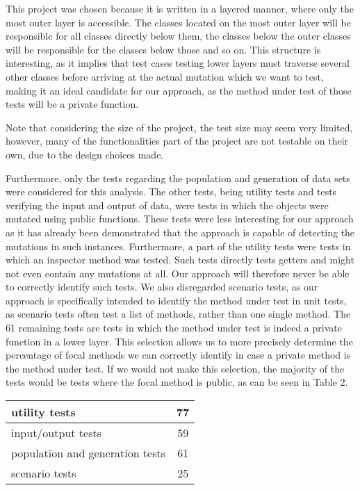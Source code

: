 \documentclass[11pt]{article}
\begin{document}
\begin{multicols}{2}
This project was chosen because it is written in a layered manner, where only the most outer layer is accessible. The classes located on the most outer layer will be responsible for all classes directly below them, the classes below the outer classes will be responsible for the classes below those and so on. This structure is interesting, as it implies that test cases testing lower layers must traverse several other classes before arriving at the actual mutation which we want to test, making it an ideal candidate for our approach, as the method under test of those tests will be a private function.

Note that considering the size of the project, the test size may seem very limited, however, many of the functionalities part of the project are not testable on their own, due to the design choices made. 

Furthermore, only the tests regarding the population and generation of data sets were considered for this analysis. The other tests, being utility tests and tests verifying the input and output of data, were tests in which the objects were mutated using public functions. These tests were less interesting for our approach as it has already been demonstrated that the approach is capable of detecting the mutations in such instances. Furthermore, a part of the utility tests were tests in which an inspector method was tested. Such tests directly tests getters and might not even contain any mutations at all. Our approach will therefore never be able to correctly identify such tests. We also disregarded scenario tests, as our approach is specifically intended to identify the method under test in unit tests, as scenario tests often test a list of methods, rather than one single method. The 61 remaining tests are tests in which the method under test is indeed a private function in a lower layer. This selection allows us to more precisely determine the percentage of focal methods we can correctly identify in case a private method is the method under test. If we would not make this selection, the majority of the tests would be tests where the focal method is public, as can be seen in Table 2.

\begin{center}
	\begin{tabular}{ |p{5.5cm}|c|  }
		\hline
		utility tests & 77\\
		\hline
		input/output tests & 59\\
		\hline
		population and generation tests & 61\\
		\hline
		scenario tests & 25 \\
		\hline
	\end{tabular}
\end{center}


\end{multicols}
\end{document}
